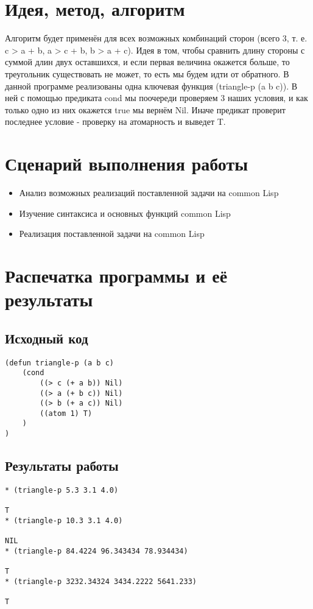 \documentclass[12pt]{article}
\begin{document}
\section{Идея, метод, алгоритм}
Алгоритм будет применён для всех возможных комбинаций сторон (всего 3, т. е. c > a + b, a > c + b, b > a + c). Идея в том, чтобы сравнить длину стороны с суммой длин двух оставшихся, и если первая величина окажется больше, то треугольник существовать не может, то есть мы будем идти от обратного. В данной программе реализованы одна ключевая функция (triangle-p (a b c)). В ней с помощью предиката cond мы поочереди проверяем 3 наших условия, и как только одно из них окажется true мы вернём Nil. Иначе предикат проверит последнее условие - проверку на атомарность и выведет T.

\section{Сценарий выполнения работы}
\begin{itemize}
\setlength{\itemsep}{-1mm}
\item Анализ возможных реализаций поставленной задачи на common Lisp
\item Изучение синтаксиса и основных функций common Lisp
\item Реализация поставленной задачи на common Lisp
\end{itemize}
\section{Распечатка программы и её результаты}

\subsection{Исходный код}
\begin{verbatim}
(defun triangle-p (a b c)
    (cond
        ((> c (+ a b)) Nil)
        ((> a (+ b c)) Nil)
        ((> b (+ a c)) Nil)
        ((atom 1) T)
    )
)
\end{verbatim}
%

\subsection{Результаты работы}
\begin{verbatim}
* (triangle-p 5.3 3.1 4.0)

T
* (triangle-p 10.3 3.1 4.0)

NIL
* (triangle-p 84.4224 96.343434 78.934434)

T
* (triangle-p 3232.34324 3434.2222 5641.233)

T
\end{verbatim}
%
\end{document}
